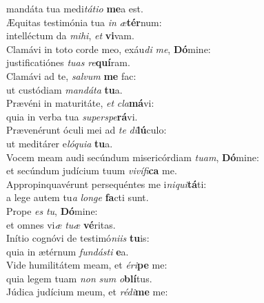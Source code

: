 \oddverse mandáta tua medi\textit{tá}\textit{ti}\textit{o} \textbf{me}a est.\\
\evenverse Æquitas testimónia tua \textit{in} \textit{æ}\textbf{tér}num:~\*\\
\evenverse intelléctum da \textit{mi}\textit{hi}, \textit{et} \textbf{vi}vam.\\
\oddverse Clamávi in toto corde meo, exáu\textit{di} \textit{me}, \textbf{Dó}mine:~\*\\
\oddverse justificatiónes \textit{tu}\textit{as} \textit{re}\textbf{quí}ram.\\
\evenverse Clamávi ad te, \textit{sal}\textit{vum} \textbf{me} fac:~\*\\
\evenverse ut custódiam \textit{man}\textit{dá}\textit{ta} \textbf{tu}a.\\
\oddverse Prævéni in maturitáte, \textit{et} \textit{cla}\textbf{má}vi:~\*\\
\oddverse quia in verba tua \textit{su}\textit{per}\textit{spe}\textbf{rá}vi.\\
\evenverse Prævenérunt óculi mei ad \textit{te} \textit{di}\textbf{lú}culo:~\*\\
\evenverse ut meditárer e\textit{ló}\textit{qui}\textit{a} \textbf{tu}a.\\
\oddverse Vocem meam audi secúndum misericórdiam \textit{tu}\textit{am}, \textbf{Dó}mine:~\*\\
\oddverse et secúndum judícium tuum \textit{vi}\textit{ví}\textit{fi}\textbf{ca} me.\\
\evenverse Appropinquavérunt persequéntes me i\textit{ni}\textit{qui}\textbf{tá}ti:~\*\\
\evenverse a lege autem tu\textit{a} \textit{lon}\textit{ge} \textbf{fa}cti sunt.\\
\oddverse Prope \textit{es} \textit{tu}, \textbf{Dó}mine:~\*\\
\oddverse et omnes vi\textit{æ} \textit{tu}\textit{æ} \textbf{vé}ritas.\\
\evenverse Inítio cognóvi de testimó\textit{ni}\textit{is} \textbf{tu}is:~\*\\
\evenverse quia in ætérnum \textit{fun}\textit{dá}\textit{sti} \textbf{e}a.\\
\oddverse Vide humilitátem meam, et \textit{é}\textit{ri}\textbf{pe} me:~\*\\
\oddverse quia legem tuam \textit{non} \textit{sum} \textit{o}\textbf{blí}tus.\\
\evenverse Júdica judícium meum, et \textit{ré}\textit{di}\textbf{me} me:~\*\\
